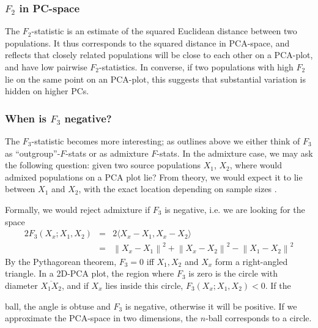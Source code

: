 \documentclass[12pt,a4pape, fullpage]{article}
\newcommand{\normsq}[1]{\left\lVert#1\right\rVert^2}
\begin{document}
\subsubsection{$F_2$ in PC-space}
The $F_2$-statistic is an estimate of the squared Euclidean distance between two
populations. It thus corresponds to the squared distance in PCA-space, and
reflects that closely related populations  will be close to each other on a
PCA-plot, and have low pairwise $F_2$-statistics. In converse, if two
populations with high $F_2$ lie on the same point on an PCA-plot, this suggests
that substantial variation is hidden on higher PCs.



\subsubsection{When is $F_3$ negative?}
The $F_3$-statistic becomes more interesting; as outlines above we either think of $F_3$ as ``outgroup''-$F$-stats or as admixture $F$-stats. In the admixture case, we may ask the following question: given two source populations $X_1$, $X_2$, where would admixed populations on a PCA plot lie? From theory, we would expect it to lie between $X_1$ and $X_2$, with the exact location depending on sample sizes \citep{brisbin2012, mcvean2009}. 

Formally, we would reject admixture if $F_3$ is negative, i.e. we are looking for the space
\begin{eqnarray}
2 F_3(X_x; X_1, X_2) &=& 2\langle  X_x - X_1, X_x - X_2 \rangle \nonumber\\
      &=& \normsq{X_x - X_1} + \normsq{X_x - X_2}  - \normsq{X_1 - X_2} 
\end{eqnarray}
By the Pythagorean theorem, $F_3 = 0 $ iff $X_1, X_2$ and $X_x$ form a right-angled triangle. In a 2D-PCA plot, the region where $F_3$ is zero is the circle  with diameter $\overline{X_1X_2}$, and if $X_x$ lies inside this circle, $F_3(X_x; X_1, X_2) < 0$. If the 

ball, the angle is obtuse and $F_3$ is negative, otherwise it will be positive. If we approximate the PCA-space in two dimensions, the $n$-ball corresponds to a circle. 
\end{document}
